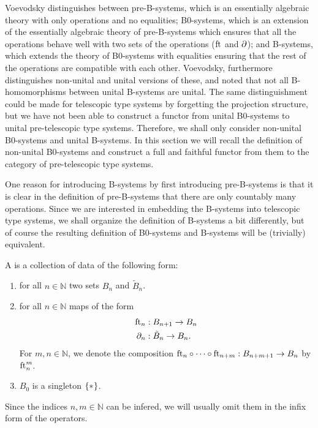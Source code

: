 Voevodsky distinguishes between pre-B-systems, which is an essentially algebraic theory with
only operations and no equalities; B0-systems, which is an extension of the
essentially algebraic theory of pre-B-systems which ensures that all the operations behave
well with two sets of the operations ($\eft$ and $\ebd$); and B-systems, which extends the 
theory of B0-systems with equalities ensuring that the rest of the operations 
are compatible with each other. Voevodsky, furthermore distinguishes
non-unital and unital versions of these, and noted that not all B-homomorphisms
between unital B-systems are unital. The same distinguishment could be made for 
telescopic type systems by forgetting the projection structure, but we have not been able to construct a
functor from unital B0-systems to unital pre-telescopic type systems. Therefore, we shall only
consider non-unital B0-systems and unital B-systems. In this section we will
recall the definition of non-unital B0-systems and construct a full and faithful
functor from them to the category of pre-telescopic type systems. 

One reason for introducing B-systems by first introducing pre-B-systems is that
it is clear in the definition of pre-B-systems that there are only countably
many operations. Since we are interested in embedding the B-systems into telescopic type systems,
we shall organize the definition of B-systems a bit differently, but of course
the resulting definition of B0-systems and B-systems will be (trivially) 
equivalent.

\begin{defn}
A  is a collection of data of the following form:
\begin{enumerate}
\item for all $n\in\mathbb{N}$ two sets $B_n$ and $\tilde{B}_n$. 
\item for all $n\in\mathbb{N}$ maps of the form
\begin{align*}
\eft[n] & : B_{n+1}\to B_n \\
\ebd[n] & : \tilde{B}_n\to B_n.
\end{align*}
For $m,n\in\mathbb{N}$, we denote the composition $\eft[n]\circ\cdots\circ\eft[n+m]:B_{n+m+1}\to B_n$ by $\eft[n]^m$. 
\item $B_0$ is a singleton $\{\pt\}$.
\end{enumerate} 
\end{defn}

\begin{rmk}
Since the indices $n,m\in\mathbb{N}$ can be infered, we will usually omit them
in the infix form of the operators.
\end{rmk}

